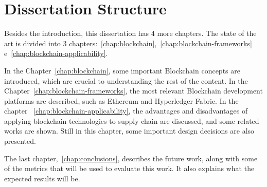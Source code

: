 \section{Dissertation Structure} \label{sec:struct}

Besides the introduction, this dissertation has 4 more chapters. The state of the art is divided into 3 chapters:~\ref{chap:blockchain},~\ref{chap:blockchain-frameworks} e~\ref{chap:blockchain-applicability}.

In the Chapter~\ref{chap:blockchain}, some important Blockchain concepts are introduced, which are crucial to understanding the rest of the content. In the Chapter~\ref{chap:blockchain-frameworks}, the most relevant Blockchain development platforms are described, such as Ethereum and Hyperledger Fabric. In the chapter ~\ref{chap:blockchain-applicability}, the advantages and disadvantages of applying blockchain technologies to supply chain are discussed, and some related works are shown. Still in this chapter, some important design decisions are also presented.

The last chapter,~\ref{chap:conclusions}, describes the future work, along with some of the metrics that will be used to evaluate this work. It also explains what the expected results will be.

